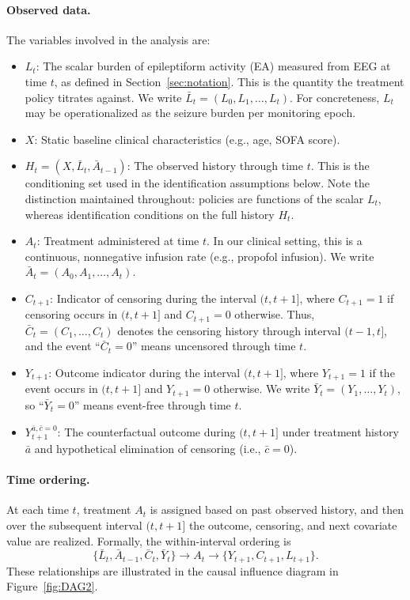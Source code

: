 \paragraph{Observed data.}
The variables involved in the analysis are:
\begin{itemize}
\item $L_t$: The scalar burden of epileptiform activity (EA) measured from EEG at time
$t$, as defined in Section~\ref{sec:notation}. This is the quantity the treatment policy
titrates against. We write $\bar L_t = (L_0,L_1,\ldots,L_t)$. For concreteness, $L_t$
may be operationalized as the seizure burden per monitoring epoch.

\item $X$: Static baseline clinical characteristics (e.g., age, SOFA score).

\item $H_t = (X,\bar L_t,\bar A_{t-1})$: The observed history through time $t$. This is
the conditioning set used in the identification assumptions below. Note the distinction
maintained throughout: policies are functions of the scalar $L_t$, whereas identification
conditions on the full history $H_t$.

\item $A_t$: Treatment administered at time $t$. In our clinical setting, this is a
continuous, nonnegative infusion rate (e.g., propofol infusion). We write
$\bar A_t = (A_0,A_1,\ldots,A_t)$.

\item $C_{t+1}$: Indicator of censoring during the interval $(t,t+1]$, where
$C_{t+1}=1$ if censoring occurs in $(t,t+1]$ and $C_{t+1}=0$ otherwise. Thus,
$\bar C_t=(C_1,\ldots,C_t)$ denotes the censoring history through interval $(t-1,t]$,
and the event ``$\bar C_t=0$'' means uncensored through time $t$.

\item $Y_{t+1}$: Outcome indicator during the interval $(t,t+1]$, where $Y_{t+1}=1$
if the event occurs in $(t,t+1]$ and $Y_{t+1}=0$ otherwise. We write
$\bar Y_t=(Y_1,\ldots,Y_t)$, so ``$\bar Y_t=0$'' means event-free through time $t$.

\item $Y^{\bar a,\bar c=0}_{t+1}$: The counterfactual outcome during $(t,t+1]$ under
treatment history $\bar a$ and hypothetical elimination of censoring (i.e., $\bar c=0$).
\end{itemize}

\paragraph{Time ordering.}
At each time $t$, treatment $A_t$ is assigned based on past observed history, and then
over the subsequent interval $(t,t+1]$ the outcome, censoring, and next covariate value
are realized. Formally, the within-interval ordering is
\begin{equation}
\{\bar L_t,\bar A_{t-1},\bar C_t,\bar Y_t\}
\longrightarrow A_t
\longrightarrow \{Y_{t+1},C_{t+1},L_{t+1}\}.
\end{equation}
These relationships are illustrated in the causal influence diagram in
Figure~\ref{fig:DAG2}.

